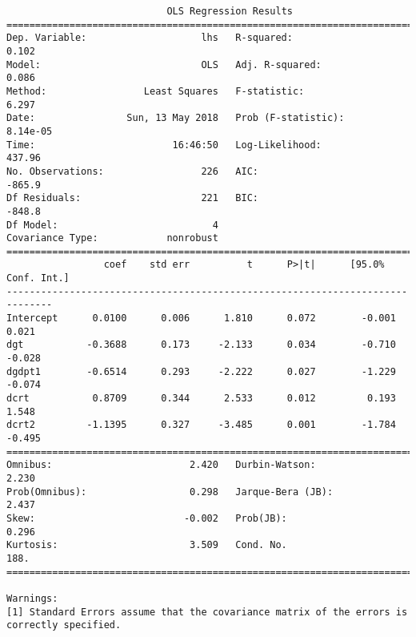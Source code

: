 \documentclass[12pt,fleqn]{article}\usepackage{../../common}
\begin{document}
\begin{verbatim}
                            OLS Regression Results                            
==============================================================================
Dep. Variable:                    lhs   R-squared:                       0.102
Model:                            OLS   Adj. R-squared:                  0.086
Method:                 Least Squares   F-statistic:                     6.297
Date:                Sun, 13 May 2018   Prob (F-statistic):           8.14e-05
Time:                        16:46:50   Log-Likelihood:                 437.96
No. Observations:                 226   AIC:                            -865.9
Df Residuals:                     221   BIC:                            -848.8
Df Model:                           4                                         
Covariance Type:            nonrobust                                         
==============================================================================
                 coef    std err          t      P>|t|      [95.0% Conf. Int.]
------------------------------------------------------------------------------
Intercept      0.0100      0.006      1.810      0.072        -0.001     0.021
dgt           -0.3688      0.173     -2.133      0.034        -0.710    -0.028
dgdpt1        -0.6514      0.293     -2.222      0.027        -1.229    -0.074
dcrt           0.8709      0.344      2.533      0.012         0.193     1.548
dcrt2         -1.1395      0.327     -3.485      0.001        -1.784    -0.495
==============================================================================
Omnibus:                        2.420   Durbin-Watson:                   2.230
Prob(Omnibus):                  0.298   Jarque-Bera (JB):                2.437
Skew:                          -0.002   Prob(JB):                        0.296
Kurtosis:                       3.509   Cond. No.                         188.
==============================================================================

Warnings:
[1] Standard Errors assume that the covariance matrix of the errors is correctly specified.
\end{verbatim}
\end{document}
